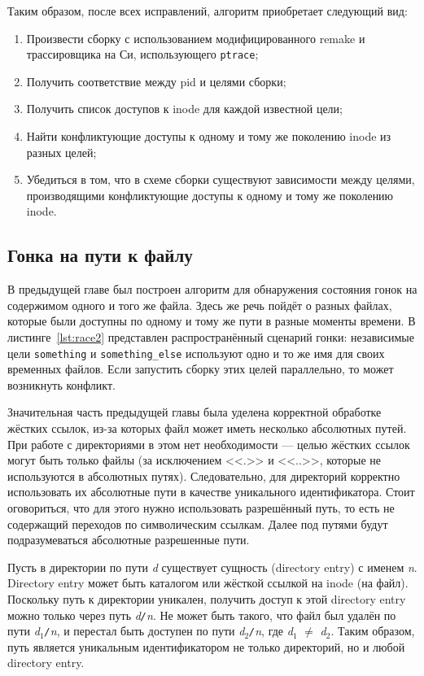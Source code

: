 Таким образом, после всех исправлений, алгоритм приобретает следующий вид:

\begin{enumerate}
	\item Произвести сборку с использованием модифицированного remake и трассировщика на Си, использующего \texttt{ptrace};
	\item Получить соответствие между pid и целями сборки;
	\item Получить список доступов к inode для каждой известной цели;
	\item Найти конфликтующие доступы к одному и тому же поколению inode из разных целей;
	\item Убедиться в том, что в схеме сборки существуют зависимости между целями, производящими конфликтующие доступы к одному и тому же поколению inode.
\end{enumerate}

\subsection{Гонка на пути к файлу}
\label{subsec:path-race}



В предыдущей главе был построен алгоритм для обнаружения состояния гонок на содержимом одного и того же файла. Здесь же речь пойдёт о разных файлах, которые были доступны по одному и тому же пути в разные моменты времени. В листинге~\ref{lst:race2} представлен распространённый сценарий гонки: независимые цели \texttt{something} и \texttt{something\_else} используют одно и то же имя для своих временных файлов. Если запустить сборку этих целей параллельно, то может возникнуть конфликт.

Значительная часть предыдущей главы была уделена корректной обработке жёстких ссылок, из-за которых файл может иметь несколько абсолютных путей. При работе с директориями в этом нет необходимости --- целью жёстких ссылок могут быть только файлы (за исключением <<.>> и <<..>>, которые не используются в абсолютных путях). Следовательно, для директорий корректно использовать их абсолютные пути в качестве уникального идентификатора. Стоит оговориться, что для этого нужно использовать разрешённый путь, то есть не содержащий переходов по символическим ссылкам. Далее под путями будут подразумеваться абсолютные разрешенные пути.

Пусть в директории по пути \textit{d} существует сущность (directory entry) с именем \textit{n}. Directory entry может быть каталогом или жёсткой ссылкой на inode (на файл). Поскольку путь к директории уникален, получить доступ к этой directory entry можно только через путь \textit{d\texttt{/}n}. Не может быть такого, что файл был удалён по пути \textit{d$_1$\texttt{/}n}, и перестал быть доступен по пути \textit{d$_2$\texttt{/}n}, где \textit{d}$_1$ $\ne$ \textit{d}$_2$. Таким образом, путь является уникальным идентификатором не только директорий, но и любой directory entry.

